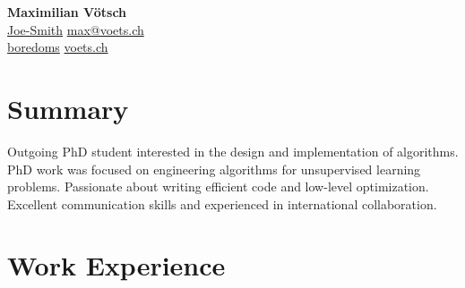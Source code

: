\documentclass[letterpaper, 10pt]{article}
\newcommand{\iconSpace}{\hspace{2px}}
\newcommand{\hSpace}{\hspace{8px}}
\newcommand{\secStartSpace}{\vspace{3pt}}
\newcommand{\secEndSpace}{\vspace{5pt}}
\newcommand{\spaceCollapse}{\vspace{-2pt}}
\begin{document}
\begin{center} 
	{\Huge \textbf{Maximilian V\"otsch}}\\
	\vspace{1px}
 \color{TextColor}
	{
		\color{white}
             \iconSpace \href{https://www.linkedin.com/in/Joe-Smith/}{Joe-Smith}
		\hfill
		\href{mailto:max@voets.ch}{max@voets.ch} \vspace{2pt} \iconSpace {} 
        }\\
	{
            \color{white}
		 \iconSpace \href{https://github.com/boredoms}{boredoms}
            \hfill
		\href{https://voets.ch/}{voets.ch} \iconSpace {} 
	}
\end{center}
\spaceCollapse
\spaceCollapse


\section{\color{blue} \textbf{Summary}}
\secStartSpace

\begin{addmargin}[0.5em]{1em}
	Outgoing PhD student interested in the design and implementation of algorithms.
	PhD work was focused on engineering algorithms for unsupervised learning problems.
	Passionate about writing efficient code and low-level optimization.
	Excellent communication skills and experienced in international collaboration.
\end{addmargin}
\secEndSpace


\section{\color{blue} \textbf{Work Experience}}
\secStartSpace
\end{document}
